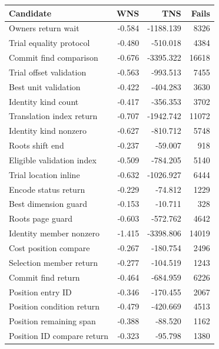 \begin{tabular}{lrrr}
\toprule
Candidate & WNS & TNS & Fails \\
\midrule
Owners return wait & -0.584 & -1188.139 & 8326 \\
Trial equality protocol & -0.480 & -510.018 & 4384 \\
Commit find comparison & -0.676 & -3395.322 & 16618 \\
Trial offset validation & -0.563 & -993.513 & 7455 \\
Best unit validation & -0.422 & -404.283 & 3630 \\
Identity kind count & -0.417 & -356.353 & 3702 \\
Translation index return & -0.707 & -1942.742 & 11072 \\
Identity kind nonzero & -0.627 & -810.712 & 5748 \\
Roots shift end & -0.237 & -59.007 & 918 \\
Eligible validation index & -0.509 & -784.205 & 5140 \\
Trial location inline & -0.632 & -1026.927 & 6444 \\
Encode status return & -0.229 & -74.812 & 1229 \\
Best dimension guard & -0.153 & -10.711 & 328 \\
Roots page guard & -0.603 & -572.762 & 4642 \\
Identity member nonzero & -1.415 & -3398.806 & 14019 \\
Cost position compare & -0.267 & -180.754 & 2496 \\
Selection member return & -0.277 & -104.519 & 1243 \\
Commit find return & -0.464 & -684.959 & 6226 \\
Position entry ID & -0.346 & -170.455 & 2067 \\
Position condition return & -0.479 & -420.669 & 4513 \\
Position remaining span & -0.388 & -88.520 & 1162 \\
Position ID compare return & -0.323 & -95.798 & 1380 \\
\bottomrule
\end{tabular}
